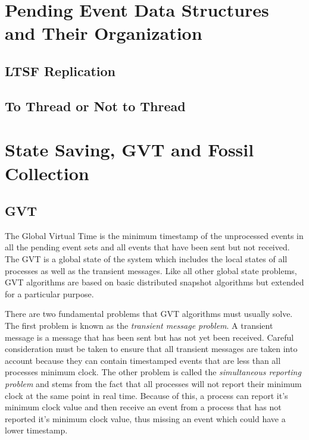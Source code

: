 \documentclass[11pt]{book}
\newcommand{\showPlots}[3]{
  \begin{figure}
    \begin{minipage}{.5\textwidth}
      \begin{center}
        \texttt{[image: figs/traffic/\#1]} \\
        Traffic Model \\
      \end{center}
    \end{minipage} \hfill \begin{minipage}{.5\textwidth}
      \begin{center}
        \texttt{[image: figs/pcs/\#1]} \\
        PCS Model \\
      \end{center}
    \end{minipage}
    \caption{#3}\label{#2}
  \end{figure}
}
\begin{document}

\chapter{Pending Event Data Structures and Their Organization}\label{pending_event_set}

\section{LTSF Replication}


\section{To Thread or Not to Thread}


\chapter{State Saving, GVT and Fossil Collection}\label{gvt_fossilcollection}


\section{GVT}

The Global Virtual Time is the minimum timestamp of the unprocessed events in all the pending event
sets and all events that have been sent but not received. The GVT is a global state of the system
which includes the local states of all processes as well as the transient messages. Like all other
global state problems, GVT algorithms are based on basic distributed snapshot algorithms
\cite{chandy-85}\cite{lai-87}\cite{mattern-93} but extended for a particular purpose.

There are two fundamental problems that GVT algorithms must usually solve. The first problem is
known as the \emph{transient message problem}. A transient message is a message that has been sent
but has not yet been received. Careful consideration must be taken to ensure that all transient
messages are taken into account because they can contain timestamped events that are less than all
processes minimum clock. The other problem is called the \emph{simultaneous reporting problem} and
stems from the fact that all processes will not report their minimum clock at the same point in
real time. Because of this, a process can report it's minimum clock value and then receive an event
from a process that has not reported it's minimum clock value, thus missing an event which could have
a lower timestamp.
\end{document}
